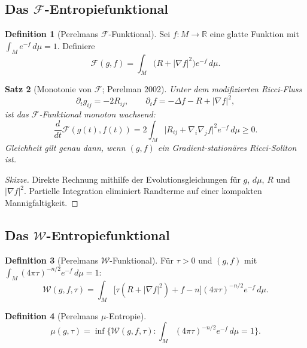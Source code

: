\documentclass[12pt,a4paper]{amsart}
\newtheorem{theorem}{Satz}[section]
\theoremstyle{definition}
\newtheorem{definition}[theorem]{Definition}
\theoremstyle{remark}
\newcommand{\R}{\mathbb{R}}
\begin{document}
\subsection{Das $\mathcal{F}$-Entropiefunktional}

\begin{definition}[Perelmans $\mathcal{F}$-Funktional]
Sei $f: M \to \R$ eine glatte Funktion mit $\int_M e^{-f}\,d\mu = 1$.
Definiere
\begin{equation}
  \mathcal{F}(g,f) = \int_M \bigl(R + |\nabla f|^2\bigr) e^{-f}\,d\mu.
\end{equation}
\end{definition}

\begin{theorem}[Monotonie von $\mathcal{F}$; Perelman 2002]
\label{thm:F-mono}
Unter dem \emph{modifizierten Ricci-Fluss}
\[
  \partial_t g_{ij} = -2 R_{ij}, \qquad
  \partial_t f = -\Delta f - R + |\nabla f|^2,
\]
ist das $\mathcal{F}$-Funktional monoton wachsend:
\begin{equation}
  \frac{d}{dt}\mathcal{F}(g(t),f(t))
  = 2\int_M \bigl|R_{ij} + \nabla_i\nabla_j f\bigr|^2 e^{-f}\,d\mu \geq 0.
\end{equation}
Gleichheit gilt genau dann, wenn $(g,f)$ ein Gradient-stationäres
Ricci-Soliton ist.
\end{theorem}

\begin{proof}[Skizze]
Direkte Rechnung mithilfe der Evolutionsgleichungen für $g$, $d\mu$, $R$
und $|\nabla f|^2$.  Partielle Integration eliminiert Randterme auf einer
kompakten Mannigfaltigkeit.
\end{proof}

\subsection{Das $\mathcal{W}$-Entropiefunktional}

\begin{definition}[Perelmans $\mathcal{W}$-Funktional]
Für $\tau > 0$ und $(g, f)$ mit $\int_M (4\pi\tau)^{-n/2}e^{-f}\,d\mu = 1$:
\begin{equation}
  \mathcal{W}(g,f,\tau)
  = \int_M \bigl[\tau(R + |\nabla f|^2) + f - n\bigr]
    (4\pi\tau)^{-n/2}e^{-f}\,d\mu.
\end{equation}
\end{definition}

\begin{definition}[Perelmans $\mu$-Entropie]
\[
  \mu(g,\tau) = \inf \bigl\{\mathcal{W}(g,f,\tau) :
    \int_M (4\pi\tau)^{-n/2}e^{-f}\,d\mu = 1 \bigr\}.
\]
\end{definition}
\end{document}
